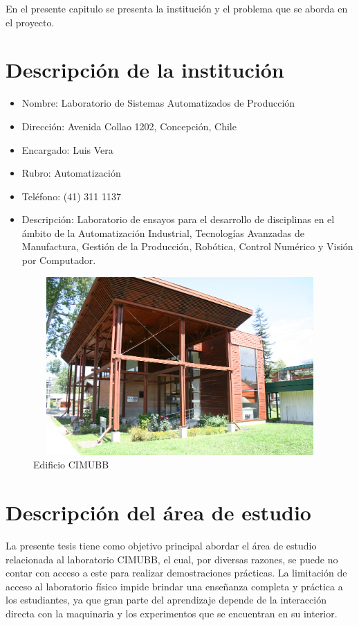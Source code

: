 En el presente capitulo se presenta la institución y el problema que se aborda en el proyecto.

\section{Descripción de la institución}
\begin{itemize}
\item Nombre: Laboratorio de Sistemas Automatizados de Producción
\item Dirección: Avenida Collao 1202, Concepción, Chile
\item Encargado: Luis Vera
\item Rubro: Automatización
\item Teléfono: (41) 311 1137
\item Descripción: Laboratorio de ensayos para el desarrollo de disciplinas en el ámbito de la Automatización Industrial, Tecnologías Avanzadas de Manufactura, Gestión de la Producción, Robótica, Control Numérico y Visión por Computador.
\end{itemize}

\begin{figure}[ht]
\centering
\includegraphics[width=13cm, height=6.8cm]{figures/cimubbfuera.jpg}
\caption{Edificio CIMUBB}
\label{fig:cimubbfuera}
\end{figure}

\clearpage
\section{Descripción del área de estudio}
La presente tesis tiene como objetivo principal abordar el área de estudio relacionada al laboratorio CIMUBB, el cual, por diversas razones, se puede no contar con acceso a este para realizar demostraciones prácticas. La limitación de acceso al laboratorio físico impide brindar una enseñanza completa y práctica a los estudiantes, ya que gran parte del aprendizaje depende de la interacción directa con la maquinaria y los experimentos que se encuentran en su interior.

